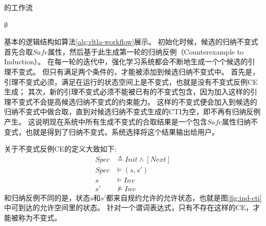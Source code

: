 \begin{algorithm}[ht]
    \caption[short]{\rltla 的工作流}
    \label{alg:rltla-workflow}
    \BlankLine
    \Ind \leftarrow \Safe \;
    \CTIs \leftarrow \GenIndCTIs{\Module, \Ind} \;
    \CEs \leftarrow $\emptyset$ \;
    \While{\CTIs \neq $\emptyset$}{
        \Inv \leftarrow \GenNextInv{\Module, \Ind, \CTIs, \CEs} \;
        \CEs \leftarrow \GenInvCEs{\Module, \Ind} \;
        \If{\CEs \equal $\emptyset$}{ 
            \If {\Eliminate{\Module, \Inv, \CTIs}}{
                \Ind \leftarrow \Ind $\wedge$ \Inv \;
                \CTIs $\leftarrow$ \GenIndCTIs{\Module, \Ind} \;
            }
        }{  
        }
    }
    \Return{\Ind}
\end{algorithm}

基本的逻辑结构如算法\ref{alg:rltla-workflow}展示。
初始化时候，候选的归纳不变式首先合取$Safe$属性，然后基于此生成第一轮的归纳反例（Counterexample to Induction）。
在每一轮的迭代中，强化学习系统都会不断地生成一个个候选的引理不变式。
但只有满足两个条件的，才能被添加到候选归纳不变式中。
首先是，引理不变式必须，满足在运行的状态空间上是不变式，也就是没有不变式反例CE生成；
其次，新的引理不变式必须不能被已有的不变式包含，因为加入这样的引理不变式不会提高候选归纳不变式的约束能力。
这样的不变式便会加入到候选的归纳不变式中做合取，直到对候选归纳不变式生成的CTI为空，即不再有归纳反例产生。
这说明现在系统中所有生成不变式的合取结果是一个包含$Safe$属性归纳不变式，也就是得到了归纳不变式，系统选择将这个结果输出给用户。

关于不变式反例CE的定义大致如下:
\begin{align}
    Spec &\triangleq Init \wedge [Next] \\
	Spec &\vDash (s, s') \label{con:ce} \\ 
	s &\vDash  Inv \\
	s' &\nvDash  Inv 
\end{align}
和归纳反例不同的是，状态$s$和$s'$都来自规约允许的允许状态，也就是图\ref{fig:ind-cti}中可到达的允许空间里的状态。
针对一个谓词表达式，只有不存在这样的CE，才能被称为不变式。

